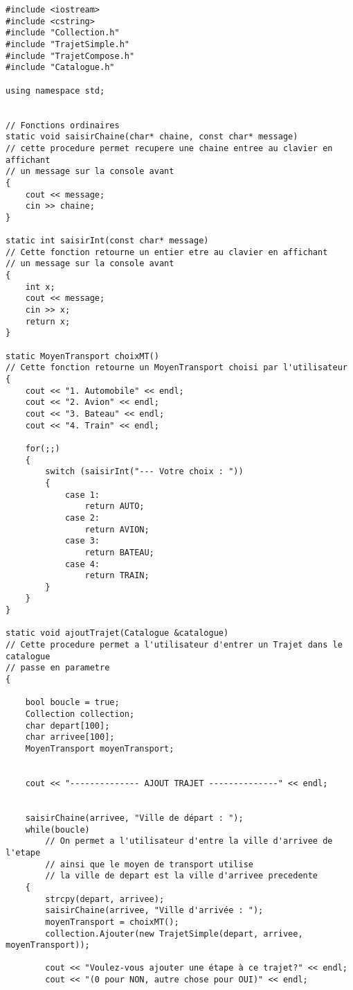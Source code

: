 \begin{verbatim}
#include <iostream>
#include <cstring>
#include "Collection.h"
#include "TrajetSimple.h"
#include "TrajetCompose.h"
#include "Catalogue.h"

using namespace std;


// Fonctions ordinaires
static void saisirChaine(char* chaine, const char* message)
// cette procedure permet recupere une chaine entree au clavier en affichant
// un message sur la console avant
{
    cout << message;
    cin >> chaine;
}

static int saisirInt(const char* message)
// Cette fonction retourne un entier etre au clavier en affichant
// un message sur la console avant
{
    int x;
    cout << message;
    cin >> x;
    return x;
}

static MoyenTransport choixMT()
// Cette fonction retourne un MoyenTransport choisi par l'utilisateur
{
    cout << "1. Automobile" << endl;
    cout << "2. Avion" << endl;
    cout << "3. Bateau" << endl;
    cout << "4. Train" << endl;
    
    for(;;)
    {
        switch (saisirInt("--- Votre choix : "))
        {
            case 1:
                return AUTO;
            case 2:
                return AVION;
            case 3:
                return BATEAU;
            case 4:
                return TRAIN;
        }
    }
}

static void ajoutTrajet(Catalogue &catalogue)
// Cette procedure permet a l'utilisateur d'entrer un Trajet dans le catalogue
// passe en parametre
{
    
    bool boucle = true;
    Collection collection;
    char depart[100];
    char arrivee[100];
    MoyenTransport moyenTransport;
    
    
    cout << "-------------- AJOUT TRAJET --------------" << endl;
    
    
    saisirChaine(arrivee, "Ville de départ : ");
    while(boucle)
        // On permet a l'utilisateur d'entre la ville d'arrivee de l'etape
        // ainsi que le moyen de transport utilise
        // la ville de depart est la ville d'arrivee precedente
    {
        strcpy(depart, arrivee);
        saisirChaine(arrivee, "Ville d'arrivée : ");
        moyenTransport = choixMT();
        collection.Ajouter(new TrajetSimple(depart, arrivee, moyenTransport));
        
        cout << "Voulez-vous ajouter une étape à ce trajet?" << endl;
        cout << "(0 pour NON, autre chose pour OUI)" << endl;
        

\end{verbatim}
